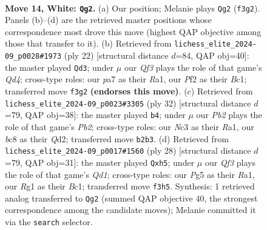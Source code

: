 \documentclass[11pt]{article}
\begin{document}
\begin{figure}[p]
\label{fig:thought-m24}
\end{figure}

\clearpage

\begin{figure}[p]\centering
\begin{subfigure}{0.46\textwidth}\centering
\resizebox{\linewidth}{!}{%
\newchessgame
\chessboard[
  setfen={rnbk3r/ppq1p1bp/3p2p1/4p1Pn/4P3/2N1BQ2/PPP2P1P/2KR1BR1 w - - 3 14},
  showmover=false,
  pgfstyle=straightmove, color=movearrow, markmove={f3-g2}
]}
\caption{}
\end{subfigure}\hfill
\begin{subfigure}{0.46\textwidth}\centering
\resizebox{\linewidth}{!}{%
\newchessgame
\chessboard[
  setfen={r1b2rk1/1pq1ppbp/p2p1np1/8/P1PQ4/2N3P1/1P2PPBP/R1BR2K1 w - - 1 12},
  showmover=false,
  pgfstyle=straightmove, color=movearrow, markmove={d4-d3}
]}
\caption{}
\end{subfigure}
\\[4pt]
\begin{subfigure}{0.46\textwidth}\centering
\resizebox{\linewidth}{!}{%
\newchessgame
\chessboard[
  setfen={r1b1r1k1/1pq2pbp/p2p2p1/2pPn3/P3NB2/6P1/1P1QPPBP/R1R3K1 w - - 4 17},
  showmover=false,
  pgfstyle=straightmove, color=movearrow, markmove={b2-b4}
]}
\caption{}
\end{subfigure}\hfill
\begin{subfigure}{0.46\textwidth}\centering
\resizebox{\linewidth}{!}{%
\newchessgame
\chessboard[
  setfen={r1bqr1k1/1p2bppp/2pp4/p6n/Pn2P3/1BN4P/1PP2PP1/R1BQ1RK1 w - - 0 15},
  showmover=false,
  pgfstyle=straightmove, color=movearrow, markmove={d1-h5}
]}
\caption{}
\end{subfigure}
\caption{\textbf{Move 14, White: \texttt{Qg2}.} (a) Our position; Melanie plays \texttt{Qg2} (\texttt{f3g2}). Panels (b)--(d) are the retrieved master positions whose correspondence most drove this move (highest QAP objective among those that transfer to it). (b) Retrieved from \texttt{lichess\_elite\_2024-09\_p0028\#1973} (ply 22) [structural distance $d$=84, QAP obj=40]: the master played \texttt{Qd3}; under $\mu$ our \emph{Qf3} plays the role of that game's \emph{Qd4}; cross-type roles: our \emph{p}a7 as their \emph{R}a1, our \emph{P}f2 as their \emph{B}c1; transferred move \texttt{f3g2} \textbf{(endorses this move)}. (c) Retrieved from \texttt{lichess\_elite\_2024-09\_p0023\#3305} (ply 32) [structural distance $d$=79, QAP obj=38]: the master played \texttt{b4}; under $\mu$ our \emph{Pb2} plays the role of that game's \emph{Pb2}; cross-type roles: our \emph{N}c3 as their \emph{R}a1, our \emph{b}c8 as their \emph{Q}d2; transferred move \texttt{b2b3}. (d) Retrieved from \texttt{lichess\_elite\_2024-09\_p0017\#1560} (ply 28) [structural distance $d$=79, QAP obj=31]: the master played \texttt{Qxh5}; under $\mu$ our \emph{Qf3} plays the role of that game's \emph{Qd1}; cross-type roles: our \emph{P}g5 as their \emph{R}a1, our \emph{R}g1 as their \emph{B}c1; transferred move \texttt{f3h5}. Synthesis: 1 retrieved analog transferred to \texttt{Qg2} (summed QAP objective 40, the strongest correspondence among the candidate moves); Melanie committed it via the \texttt{search} selector.}
\label{fig:thought-m26}
\end{figure}
\end{document}
